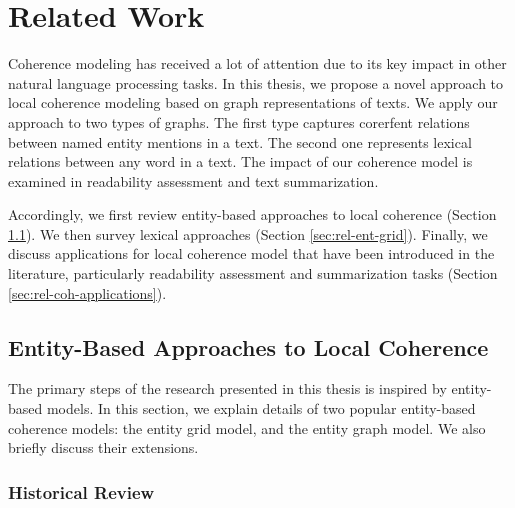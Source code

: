 
\chapter{Related Work}
\label{ch:rel-work}
 
Coherence modeling has received a lot of attention due to its key impact in other natural language processing tasks. 
In this thesis, we propose a novel approach to local coherence modeling based on graph representations of texts. 
We apply our approach to two types of graphs. 
The first type captures corerfent relations between named entity mentions in a text.
The second one represents lexical relations between any word in a text.  
The impact of our coherence model is examined in readability assessment and text summarization. 

Accordingly, we first review entity-based approaches to local coherence (Section \ref{sec:rel-entity-models}). 
We then survey lexical approaches (Section \ref{sec:rel-ent-grid}). 
Finally, we discuss applications for local coherence model that have been introduced in the literature, particularly readability assessment and summarization tasks (Section \ref{sec:rel-coh-applications}). 

\section{Entity-Based Approaches to Local Coherence}
\label{sec:rel-entity-models}

The primary steps of the research presented in this thesis is inspired by entity-based models. 
In this section, we explain details of two popular entity-based coherence models: the entity grid model, and the entity graph model. 
We also briefly discuss their extensions.  

\subsection{Historical Review}

